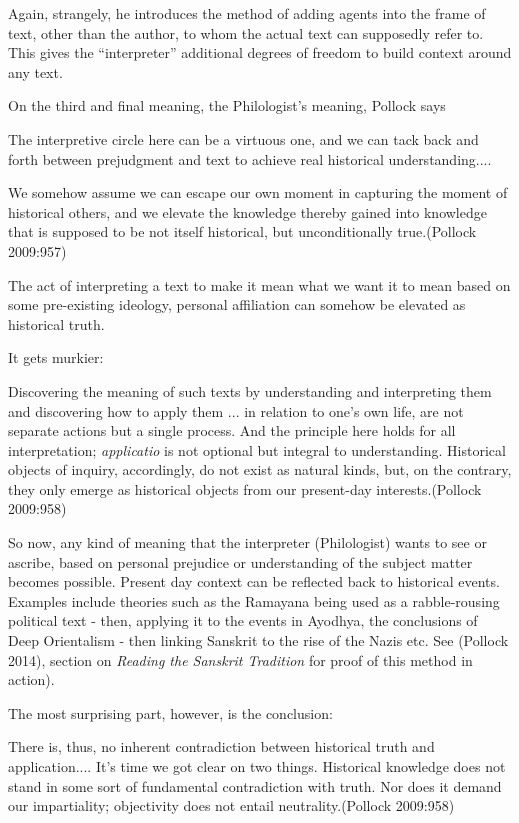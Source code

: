 Again, strangely, he introduces the method of adding agents into the frame of text, other than the author, to whom the actual text can supposedly refer to. This gives the ``interpreter'' additional degrees of freedom to build context around any text.

On the third and final meaning, the Philologist's meaning, Pollock says
\begin{myquote}
The interpretive circle here can be a virtuous one, and we can tack back and forth between prejudgment and text to achieve real historical understanding....

We somehow assume we can escape our own moment in capturing the moment of historical others, and we elevate the knowledge thereby gained into knowledge that is supposed to be not itself historical, but unconditionally true.\hfill (Pollock 2009:957)
\end{myquote}

The act of interpreting a text to make it mean what we want it to mean based on some pre-existing ideology, personal affiliation can somehow be elevated as historical truth.

It gets murkier:
\begin{myquote}
Discovering the meaning of such texts by understanding and interpreting them and discovering how to apply them ... in relation to one's own life, are not separate actions but a single process. And the principle here holds for all interpretation; {\sl applicatio} is not optional but integral to understanding. Historical objects of inquiry, accordingly, do not exist as natural kinds, but, on the contrary, they only emerge as historical objects from our present-day interests.\hfill (Pollock 2009:958)
\end{myquote}

So now, any kind of meaning that the interpreter (Philologist) wants to see or ascribe, based on personal prejudice or understanding of the subject matter becomes possible. Present day context can be reflected back to historical events. Examples include theories such as the Ramayana being used as a rabble-rousing  political text - then, applying it  to the events in Ayodhya, the conclusions of Deep Orientalism - then linking Sanskrit to the rise of the Nazis etc. See (Pollock 2014), section on {\sl Reading the Sanskrit Tradition} for proof of this method in action).

The most surprising part, however, is the conclusion:
\begin{myquote}
There is, thus, no inherent contradiction between historical truth and application.... It's time we got clear on two things. Historical knowledge does not stand in some sort of fundamental contradiction with truth. Nor does it demand our impartiality; objectivity does not entail neutrality.\hfill (Pollock 2009:958)
\end{myquote}

